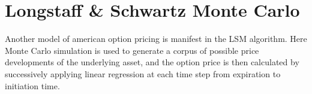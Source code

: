 \section{Longstaff \& Schwartz Monte Carlo}

Another model of american option pricing is manifest in the LSM algorithm. Here
Monte Carlo simulation is used to generate a corpus of possible price
developments of the underlying asset, and the option price is then calculated
by successively applying linear regression at each time step from expiration to
initiation time.

